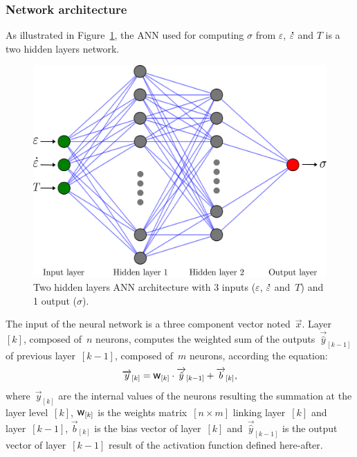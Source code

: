 \documentclass[algorithms,article,submit,pdftex,oneauthors]{Definitions/mdpi}
\DeclareRobustCommand{\w}{\mbox{\large\ensuremath{\mathsf{w}}}}
\DeclareRobustCommand{\lay}[1]{_{[#1]}}
\DeclareRobustCommand{\Lay}[1]{\mbox{$[#1]$}}
\DeclareRobustCommand{\mdot}[1]{\accentset{\mbox{\bfseries .}}{#1}}
\begin{document}
\subsubsection{Network architecture}\label{subsubsec:ANN-arch}

\textcolor{greencolor}{As illustrated in Figure~\ref{fig:ANN-2HL}, the ANN used for computing $\sigma$ from $\varepsilon$, $\mdot{\varepsilon}$ and $T$ is a two hidden layers network.}
\begin{figure}[h!]
\centering
\includegraphics[width=0.55\columnwidth]{Figures/ANN-2HL}
\caption{Two hidden layers ANN architecture with 3 inputs ($\varepsilon$, $\mdot{\varepsilon}$ and~$T$) and 1 output ($\sigma$).}
\label{fig:ANN-2HL}
\end{figure}
The input of the neural network is a three component vector noted~$\overrightarrow{x}$.
\textcolor{greencolor}{Layer~\Lay{k}, composed of~$n$ neurons, computes the weighted sum of the outputs~$\overrightarrow{\hat{y}}\lay{k-1}$ of previous layer~\Lay{k-1}, composed of~$m$ neurons, according the equation:}
\begin{equation}
\overrightarrow{y}\lay{k} = \w\lay{k} \cdot \overrightarrow{\hat{y}}\lay{k-1}+ \overrightarrow{b}\lay{k}\label{eq:ANN-y},
\end{equation}
\textcolor{greencolor}{where~$\overrightarrow{y}\lay{k}$ are the internal values of the neurons resulting the summation at the layer level~\Lay{k}, $\w\lay{k}$ is the weights matrix~$[n\times m]$ linking layer~\Lay{k} and layer~\Lay{k-1}, $\overrightarrow{b}\lay{k}$ is the bias vector of layer~\Lay{k} and~$\overrightarrow{\hat{y}}\lay{k-1}$ is the output vector of layer~\Lay{k-1} result of the activation function defined here-after.}
\end{document}
